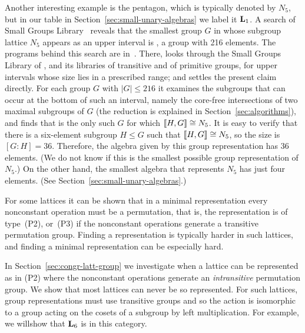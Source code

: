 Another interesting example is the pentagon, which is typically denoted by
$N_5$, but in our table in Section~\ref{sec:small-unary-algebras} we
label it $\mathbf{L}_1$.  A search of \gaps Small Groups Library~\cite{GAP4}
reveals that the smallest group $G$ in whose subgroup lattice
$N_5$ appears as an upper interval is , 
a group with 216 elements.  The programs behind this search are
in~\cite{finlatrepgap}.  There,  looks through
the Small Groups Library of \gap, and its libraries of transitive and of
primitive groups, for upper intervals whose size lies in a prescribed
range; and  settles the present claim directly.  For
each group $G$ with $|G| \leq 216$ it examines the subgroups that can
occur at the bottom of such an interval, namely the core-free
intersections of two maximal subgroups of $G$ (the reduction is explained
in Section~\ref{sec:algorithms}), and finds that 
is the only such $G$ for which $\llbracket H, G\rrbracket \cong N_5$.  It is easy
to verify that there is a six-element subgroup $H\leq G$ such that
$\llbracket H, G\rrbracket \cong N_5$, so the size is $[G:H]= 36$. Therefore,
the algebra given by this group representation has 36 elements.
(We do not know if this is the smallest possible group representation of $N_5$.)
On the other hand, the smallest algebra that represents $N_5$ has just four elements.
(See Section~\ref{sec:small-unary-algebras}.)


For some lattices it can be shown that in a minimal 
representation every nonconstant operation must be a 
permutation, that is, the representation is of type~(P2),
or~(P3) if the nonconstant operations generate a transitive permutation group.
Finding a representation is typically harder in such lattices,
and finding a minimal representation can be especially hard.

In Section~\ref{sec:congr-latt-group} we investigate when
a lattice can be represented as in (P2) where the 
nonconstant operations generate an \emph{intransitive}
permutation group.
We show that most lattices
can never be so represented. For such lattices, group 
representations must use transitive groups and so the
action is isomorphic to a group acting on the cosets
of a subgroup by left multiplication. For example,
we willshow that
$\mathbf{L}_6$ is in this category.


